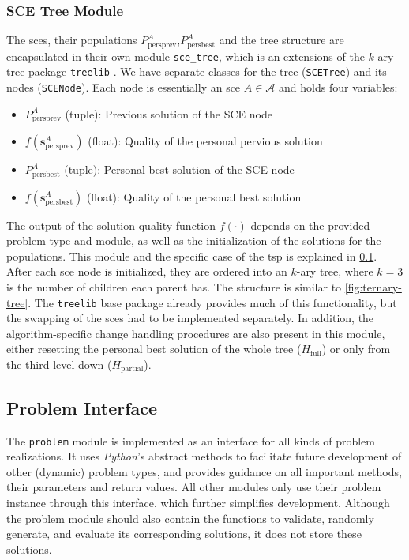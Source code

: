 \subsubsection{SCE Tree Module}

The \glspl{sce}, their populations $P^A_{\text{persprev}}$,$P^A_{\text{persbest}}$ and the tree structure are encapsulated in their own module \texttt{sce\_tree}, which is an extensions of the $k$-ary tree package \texttt{treelib} \cite{chen2018treelib}.
We have separate classes for the tree (\texttt{SCETree}) and its nodes (\texttt{SCENode}). Each node is essentially an \gls{sce} $A \in \mathcal{A}$ and holds four variables:
\begin{itemize}
	\item $P^A_{\text{persprev}}$ (tuple): Previous solution of the SCE node
	\item $f(\mathbf{s}^A_{\text{persprev}})$ (float): Quality of the personal pervious solution
	\item $P^A_{\text{persbest}}$ (tuple): Personal best solution of the SCE node
	\item $f(\mathbf{s}^A_{\text{persbest}})$ (float): Quality of the personal best solution
\end{itemize}

The output of the solution quality function $f(\cdot)$ depends on the provided problem type and module, as well as the initialization of the solutions for the populations. This module and the specific case of the \gls{tsp} is explained in \cref{chap:impl-problem}.
After each \gls{sce} node is initialized, they are ordered into an $k$-ary tree, where $k = 3$ is the number of children each parent has. The structure is similar to \cref{fig:ternary-tree}.
The \texttt{treelib} base package already provides much of this functionality, but the swapping of the \glspl{sce} had to be implemented separately.
In addition, the algorithm-specific change handling procedures are also present in this module, either resetting the personal best solution of the whole tree ($H_{\text{full}}$) or only from the third level down ($H_{\text{partial}}$).

\subsection{Problem Interface}
\label{chap:impl-problem}

The \texttt{problem} module is implemented as an interface for all kinds of problem realizations. It uses \textit{Python}'s abstract methods to facilitate future development of other (dynamic) problem types, and provides guidance on all important methods, their parameters and return values. All other modules only use their problem instance through this interface, which further simplifies development.
Although the problem module should also contain the functions to validate, randomly generate, and evaluate its corresponding solutions, it does not store these solutions.

